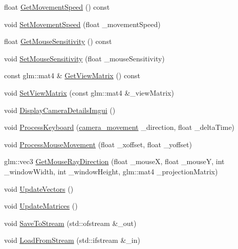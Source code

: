 \begin{DoxyCompactItemize}
float \mbox{\hyperlink{classpiolot_1_1_camera_ad270b37d787605772644f35b844992b0}{Get\+Movement\+Speed}} () const
\item 
void \mbox{\hyperlink{classpiolot_1_1_camera_aaf2988ab05281a6a1404207a76957ad6}{Set\+Movement\+Speed}} (float \+\_\+movement\+Speed)
\item 
float \mbox{\hyperlink{classpiolot_1_1_camera_a4f9b65c8df717b82c3b7193457ce71f0}{Get\+Mouse\+Sensitivity}} () const
\item 
void \mbox{\hyperlink{classpiolot_1_1_camera_ade560e16d6c3775dab0637873e66e762}{Set\+Mouse\+Sensitivity}} (float \+\_\+mouse\+Sensitivity)
\item 
const glm\+::mat4 \& \mbox{\hyperlink{classpiolot_1_1_camera_ad57c30f9e3f381a492b38566eab4b905}{Get\+View\+Matrix}} () const
\item 
void \mbox{\hyperlink{classpiolot_1_1_camera_adf17d4592d4d144ea3deab9d8d5d836d}{Set\+View\+Matrix}} (const glm\+::mat4 \&\+\_\+view\+Matrix)
\item 
void \mbox{\hyperlink{classpiolot_1_1_camera_aa9172dabf1f037963c8f93f7b774cd9e}{Display\+Camera\+Details\+Imgui}} ()
\item 
void \mbox{\hyperlink{classpiolot_1_1_camera_a55a4d1a5773d240f08c766e6566591b3}{Process\+Keyboard}} (\mbox{\hyperlink{classpiolot_1_1_camera_afba5e0e4539ee7666e8354842c4988e0}{camera\+\_\+movement}} \+\_\+direction, float \+\_\+delta\+Time)
\item 
void \mbox{\hyperlink{classpiolot_1_1_camera_ae6e18ad2ee8ca787ffe5fa35a01dd16b}{Process\+Mouse\+Movement}} (float \+\_\+xoffset, float \+\_\+yoffset)
\item 
glm\+::vec3 \mbox{\hyperlink{classpiolot_1_1_camera_a6f2dd8513b5f87e438e2721bd32b22c0}{Get\+Mouse\+Ray\+Direction}} (float \+\_\+mouseX, float \+\_\+mouseY, int \+\_\+window\+Width, int \+\_\+window\+Height, glm\+::mat4 \+\_\+projection\+Matrix)
\item 
void \mbox{\hyperlink{classpiolot_1_1_camera_a3e5675563dc81e8526c012e54cb92c9f}{Update\+Vectors}} ()
\item 
void \mbox{\hyperlink{classpiolot_1_1_camera_a93e6bf77b4c9a6a1402a4866dc2590e9}{Update\+Matrices}} ()
\item 
void \mbox{\hyperlink{classpiolot_1_1_camera_abd25ede2299da256764a59e991a8e25a}{Save\+To\+Stream}} (std\+::ofstream \&\+\_\+out)
\item 
void \mbox{\hyperlink{classpiolot_1_1_camera_acca1f703bec64c28d501760920cf8d57}{Load\+From\+Stream}} (std\+::ifstream \&\+\_\+in)
\end{DoxyCompactItemize}
